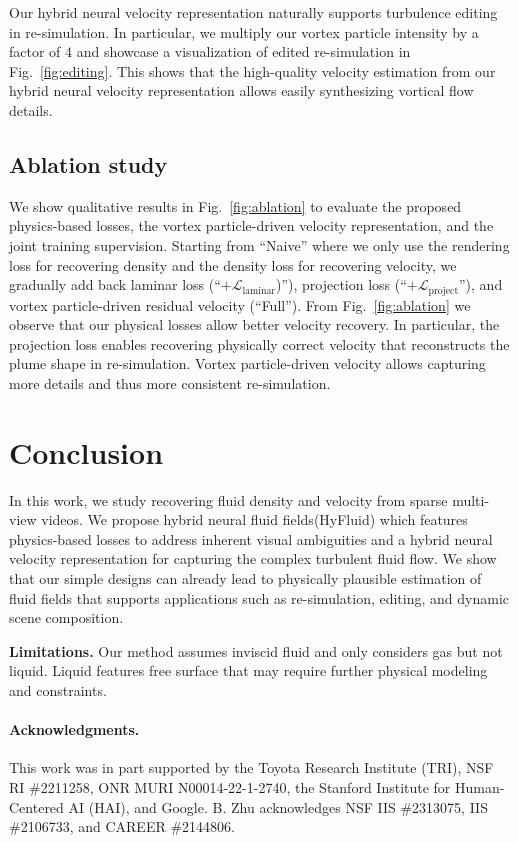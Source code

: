\documentclass{article}
\newcommand{\fig}[1]{Fig.~\ref{#1}}
\newcommand{\modelfull}{hybrid neural fluid fields\xspace}
\newcommand{\model}{HyFluid\xspace}
\begin{document}
Our hybrid neural velocity representation naturally supports turbulence editing in re-simulation. In particular, we multiply our vortex particle intensity by a factor of $4$ and showcase a visualization of edited re-simulation in \fig{fig:editing}. This shows that the high-quality velocity estimation from our hybrid neural velocity representation allows easily synthesizing vortical flow details.


\subsection{Ablation study}
We show qualitative results in \fig{fig:ablation} to evaluate the proposed physics-based losses, the vortex particle-driven velocity representation, and the joint training supervision. Starting from ``Naive'' where we only use the rendering loss for recovering density and the density loss for recovering velocity, we gradually add back laminar loss (``$+\mathcal{L}_\text{laminar}$)''), projection loss (``$+\mathcal{L}_\text{project}$''), and vortex particle-driven residual velocity (``Full''). From \fig{fig:ablation} we observe that our physical losses allow better velocity recovery. In particular, the projection loss enables recovering physically correct velocity that reconstructs the plume shape in re-simulation. Vortex particle-driven velocity allows capturing more details and thus more consistent re-simulation. 

 \section{Conclusion}
In this work, we study recovering fluid density and velocity from sparse multi-view videos. We propose \modelfull (\model) which features physics-based losses to address inherent visual ambiguities and a hybrid neural velocity representation for capturing the complex turbulent fluid flow. We show that our simple designs can already lead to physically plausible estimation of fluid fields that supports applications such as re-simulation, editing, and dynamic scene composition.

\textbf{Limitations.} Our method assumes inviscid fluid and only considers gas but not liquid. Liquid features free surface that may require further physical modeling and constraints. 
\paragraph{Acknowledgments.} This work was in part supported by the Toyota Research Institute (TRI), NSF RI \#2211258, ONR MURI N00014-22-1-2740, the Stanford Institute for Human-Centered AI (HAI), and Google. B. Zhu acknowledges NSF IIS \#2313075, IIS \#2106733, and CAREER \#2144806. 
\end{document}
